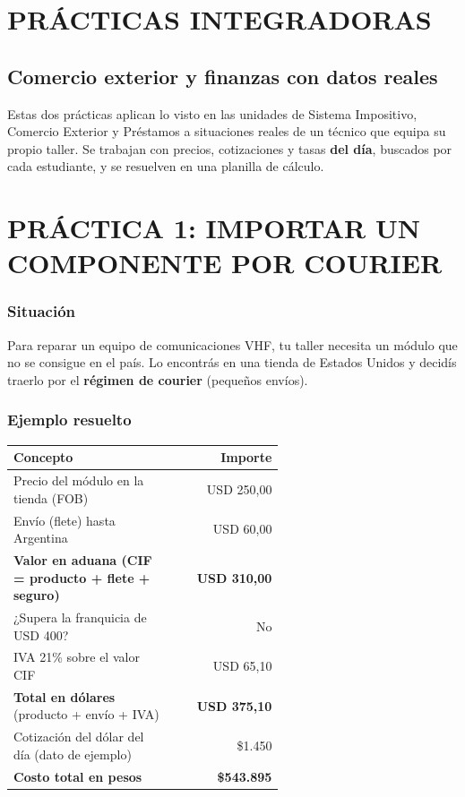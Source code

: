 \clearpage
\section*{PRÁCTICAS INTEGRADORAS}
\subsection*{Comercio exterior y finanzas con datos reales}

\begin{recuadro}
Estas dos prácticas aplican lo visto en las unidades de Sistema Impositivo, Comercio Exterior y
Préstamos a situaciones reales de un técnico que equipa su propio taller. Se trabajan con
precios, cotizaciones y tasas \textbf{del día}, buscados por cada estudiante, y se resuelven en
una planilla de cálculo.
\end{recuadro}

\section*{PRÁCTICA 1: IMPORTAR UN COMPONENTE POR COURIER}

\subsubsection*{Situación}
Para reparar un equipo de comunicaciones VHF, tu taller necesita un módulo que no se consigue
en el país. Lo encontrás en una tienda de Estados Unidos y decidís traerlo por el
\textbf{régimen de courier} (pequeños envíos).

\subsubsection*{Ejemplo resuelto}
\begin{center}
\small
\begin{tabular}{|p{0.60\linewidth}|r|}
\hline
\textbf{Concepto} & \textbf{Importe} \\ \hline
Precio del módulo en la tienda (FOB) & USD 250,00 \\ \hline
Envío (flete) hasta Argentina & USD 60,00 \\ \hline
\textbf{Valor en aduana (CIF = producto + flete + seguro)} & \textbf{USD 310,00} \\ \hline
¿Supera la franquicia de USD 400? & No \\ \hline
IVA 21\% sobre el valor CIF & USD 65,10 \\ \hline
\textbf{Total en dólares} (producto + envío + IVA) & \textbf{USD 375,10} \\ \hline
Cotización del dólar del día (dato de ejemplo) & \$1.450 \\ \hline
\textbf{Costo total en pesos} & \textbf{\$543.895} \\ \hline
\end{tabular}
\end{center}

